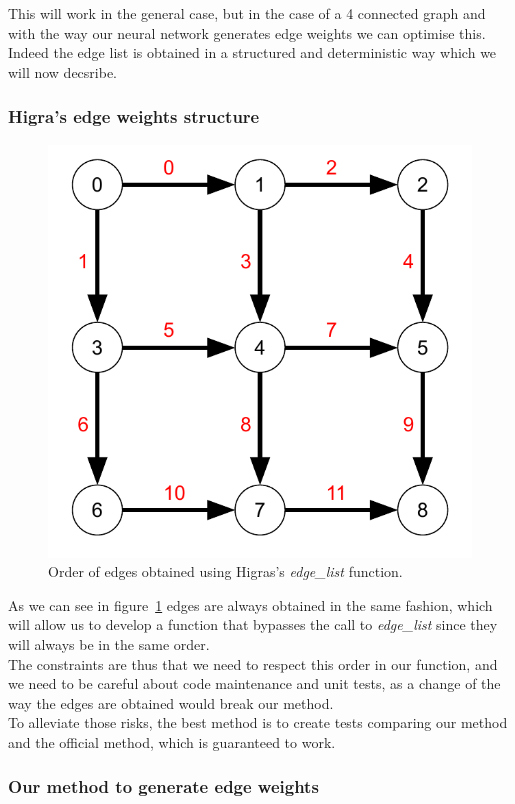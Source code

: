 This will work in the general case, but in the case of a 4 connected graph and
with the way our neural network generates edge weights we can optimise this.
Indeed the edge list is obtained in a structured and deterministic way which
we will now decsribe.


\subsubsection{Higra's edge weights structure}

\begin{figure}[!htbp]
	\centering
	\includegraphics[width=0.4\linewidth]{./images/graph-order.pdf}
	\caption{Order of edges obtained using Higras's \textit{edge\_list}
	function.}%
	\label{fig:graph_order}
\end{figure}

As we can see in figure~\ref{fig:graph_order} edges are always obtained in the
same fashion, which will allow us to develop a function that bypasses the call
to \textit{edge\_list} since they will always be in the same order.\\
The constraints are thus that we need to respect this order in our function, and
we need to be careful about code maintenance and unit tests, as a change of the
way the edges are obtained would break our method.\\
To alleviate those risks, the best method is to create tests comparing our
method and the official method, which is guaranteed to work.


\subsubsection{Our method to generate edge weights}

